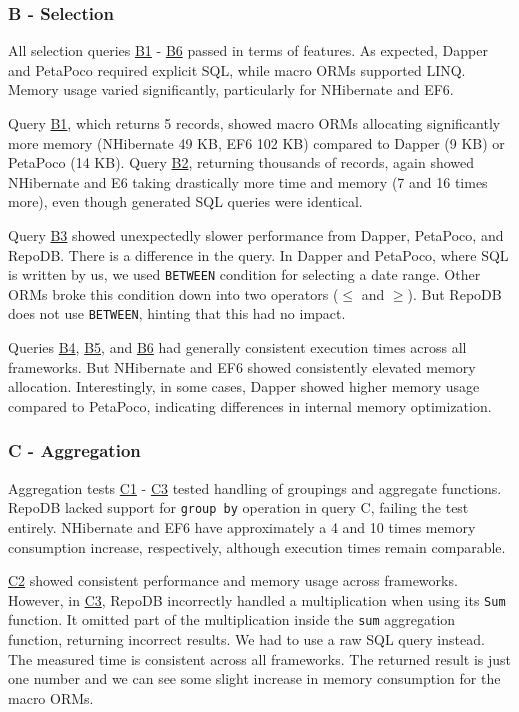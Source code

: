\subsubsection{B - Selection}
All selection queries \hyperref[query:b1]{B1} - \hyperref[query:b6]{B6} passed in terms of features. As expected, Dapper and PetaPoco required explicit SQL, while macro ORMs supported LINQ. Memory usage varied significantly, particularly for NHibernate and EF6.

Query \hyperref[query:b1]{B1}, which returns 5 records, showed macro ORMs allocating significantly more memory (NHibernate 49 KB, EF6 102 KB) compared to Dapper (9 KB) or PetaPoco (14 KB). Query \hyperref[query:b2]{B2}, returning thousands of records, again showed NHibernate and E6 taking drastically more time and memory (7 and 16 times more), even though generated SQL queries were identical.

Query \hyperref[query:b3]{B3} showed unexpectedly slower performance from Dapper, PetaPoco, and RepoDB. There is a difference in the query. In Dapper and PetaPoco, where SQL is written by us, we used \texttt{BETWEEN} condition for selecting a date range. Other ORMs broke this condition down into two operators ($\leq$ and $\geq$). But RepoDB does not use \texttt{BETWEEN}, hinting that this had no impact.

Queries \hyperref[query:b4]{B4}, \hyperref[query:b5]{B5}, and \hyperref[query:b6]{B6} had generally consistent execution times across all frameworks. But NHibernate and EF6 showed consistently elevated memory allocation. Interestingly, in some cases, Dapper showed higher memory usage compared to PetaPoco, indicating differences in internal memory optimization. 

\subsubsection{C - Aggregation}
Aggregation tests \hyperref[query:c1]{C1} - \hyperref[query:c3]{C3} tested handling of groupings and aggregate functions. RepoDB lacked support for \texttt{group by} operation in query C, failing the test entirely. NHibernate and EF6 have approximately a 4 and 10 times memory consumption increase, respectively, although execution times remain comparable. 

\hyperref[query:c2]{C2} showed consistent performance and memory usage across frameworks. However, in \hyperref[query:c3]{C3}, RepoDB incorrectly handled a multiplication when using its \texttt{Sum} function. It omitted part of the multiplication inside the \texttt{sum} aggregation function, returning incorrect results. We had to use a raw SQL query instead. The measured time is consistent across all frameworks. The returned result is just one number and we can see some slight increase in memory consumption for the macro ORMs.

